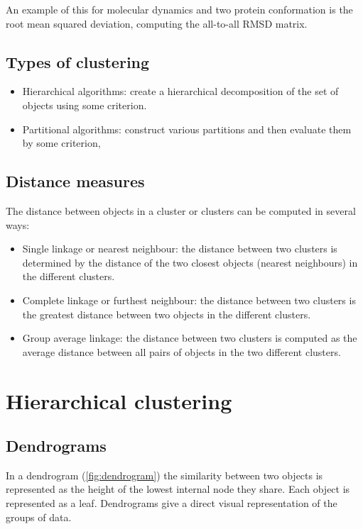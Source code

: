 	An example of this for molecular dynamics and two protein conformation is the root mean squared deviation, computing the all-to-all RMSD matrix.

	\subsection{Types of clustering}

	\begin{multicols}{2}
		\begin{itemize}
			\item Hierarchical algorithms: create a hierarchical decomposition of the set of objects using some criterion.
			\item Partitional algorithms: construct various partitions and then evaluate them by some criterion,
		\end{itemize}
	\end{multicols}

	\subsection{Distance measures}
	The distance between objects in a cluster or clusters can be computed in several ways:

	\begin{multicols}{2}
		\begin{itemize}
			\item Single linkage or nearest neighbour: the distance between two clusters is determined by the distance of the two closest objects (nearest neighbours) in the different clusters.
			\item Complete linkage or furthest neighbour: the distance between two clusters is the greatest distance between two objects in the different clusters.
			\item Group average linkage: the distance between two clusters is computed as the average distance between all pairs of objects in the two different clusters.
		\end{itemize}
	\end{multicols}

\section{Hierarchical clustering}

	\subsection{Dendrograms}
	In a dendrogram (\ref{fig:dendrogram}) the similarity between two objects is represented as the height of the lowest internal node they share.
	Each object is represented as a leaf.
	Dendrograms give a direct visual representation of the groups of data.

